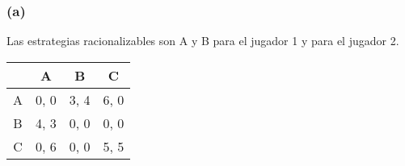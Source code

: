 \documentclass{article}
\begin{document}
            \subsubsection*{(a)}
                Las estrategias racionalizables son A y B para el jugador 1 y para el jugador 2.
                \begin{table}[H]
                    \begin{tabular}{|c|c|c|c|}
                        \hline
                                & A & B & C \\ \hline
                            A & 0, 0 & 3, 4 & 6, 0 \\ 
                            B & 4, 3 & 0, 0 & 0, 0 \\
                            C & 0, 6 & 0, 0 & 5, 5 \\ \hline
                    \end{tabular}
                \end{table}
\end{document}
